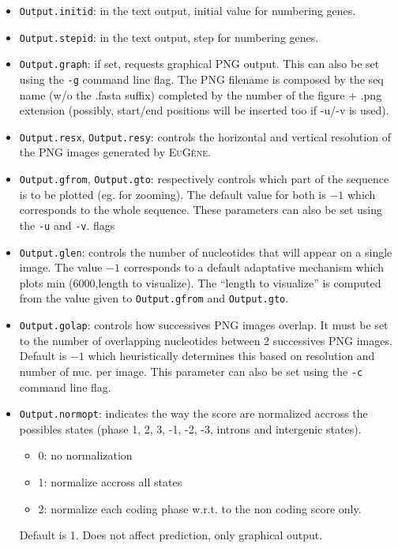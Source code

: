 \documentclass[a4paper,titlepage]{report}
\newcommand{\EuGene}{\textsc{EuG\`ene}}
\begin{document}
\begin{itemize}
\item \texttt{Output.initid}: in the text output, initial value for numbering genes.

\item \texttt{Output.stepid}: in the text output, step for numbering genes.

\item \texttt{Output.graph}: if set, requests graphical PNG output.
  This can also be set using the \texttt{-g} command line flag. 
  The PNG filename is composed by the seq name (w/o the .fasta suffix) completed by
  the number of the figure + .png extension (possibly,
  start/end positions will be inserted too if -u/-v is used).
  
\item \texttt{Output.resx}, \texttt{Output.resy}: controls the
  horizontal and vertical resolution of the PNG images generated by
  \EuGene. 
  
\item \texttt{Output.gfrom}, \texttt{Output.gto}: respectively
  controls which part of the sequence is to be plotted (eg. for
  zooming). The default value for both is $-1$ which corresponds to
  the whole sequence. These parameters can also be set using the
  \texttt{-u} and \texttt{-v}. flags 

\item \texttt{Output.glen}: controls the number of nucleotides that
  will appear on a single image. The value $-1$ corresponds to a
  default adaptative mechanism which plots min (6000,length to
  visualize). The ``length to visualize'' is computed from the value
  given to \texttt{Output.gfrom} and \texttt{Output.gto}.
  
\item \texttt{Output.golap}: controls how successives PNG images
  overlap. It must be set to the number of overlapping nucleotides
  between 2 successives PNG images. Default is $-1$ which
  heuristically determines this based on resolution and number of nuc.
  per image. This parameter can also be set using the \texttt{-c}
  command line flag. 
    
\item \texttt{Output.normopt}: indicates the way the score are
  normalized accross the possibles states (phase 1, 2, 3, -1, -2, -3,
  introns and intergenic states).
  \begin{itemize}
  \item 0: no normalization
  \item 1: normalize accross all states
  \item 2: normalize each coding phase w.r.t. to the non coding
    score only.
  \end{itemize}
  Default is 1. Does not affect prediction, only graphical output.


\end{itemize}
\end{document}

